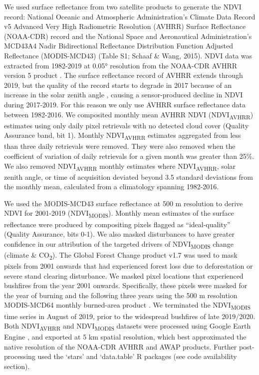 \documentclass[gc, manuscript]{copernicus}
\begin{document}
We used surface reflectance from two satellite products to generate the
NDVI record: National Oceanic and Atmospheric Administration's Climate
Data Record v5 Advanced Very High Radiometric Resolution (AVHRR) Surface
Reflectance (NOAA-CDR) record and the National Space and Aeronautical
Administration's MCD43A4 Nadir Bidirectional Reflectance Distribution
Function Adjusted Reflectance (MODIS-MCD43) (Table S1; Schaaf \& Wang,
2015). NDVI data was extracted from 1982-2019 at 0.05° resolution from
the NOAA-CDR AVHRR version 5 product \citep{vermoteNOAAClimateData2018}.
The surface reflectance record of AVHRR extends through 2019, but the
quality of the record starts to degrade in 2017 because of an increase
in the solar zenith angle \citep{jiEffectNOAASatellite2017a}, causing a
sensor-produced decline in NDVI during 2017-2019. For this reason we
only use AVHRR surface reflectance data between 1982-2016. We composited
monthly mean AVHRR NDVI (NDVI\textsubscript{AVHRR}) estimates using only
daily pixel retrievals with no detected cloud cover (Quality Assurance
band, bit 1). Monthly NDVI\textsubscript{AVHRR} estimates aggregated
from less than three daily retrievals were removed. They were also
removed when the coefficient of variation of daily retrievals for a
given month was greater than 25\%. We also removed
NDVI\textsubscript{AVHRR} monthly estimates where
NDVI\textsubscript{AVHRR}, solar zenith angle, or time of acquisition
deviated beyond 3.5 standard deviations from the monthly mean,
calculated from a climatology spanning 1982-2016.

We used the MODIS-MCD43 surface reflectance at 500 m resolution to
derive NDVI for 2001-2019 (NDVI\textsubscript{MODIS}). Monthly mean
estimates of the surface reflectance were produced by compositing pixels
flagged as ``ideal-quality'' (Quality Assurance, bits 0-1). We also
masked disturbances to have greater confidence in our attribution of the
targeted drivers of NDVI\textsubscript{MODIS} change (climate \&
CO\textsubscript{2}). The Global Forest Change product v1.7
\citep{hansenHighResolutionGlobalMaps2013e} was used to mask pixels from
2001 onwards that had experienced forest loss due to deforestation or
severe stand clearing disturbance. We masked pixel locations that
experienced bushfires from the year 2001 onwards. Specifically, these
pixels were masked for the year of burning and the following three years
using the 500 m resolution MODIS-MCD64 monthly burned-area product
\citep{giglioCollectionMODISBurned2018b}. We terminated the
NDVI\textsubscript{MODIS} time series in August of 2019, prior to the
widespread bushfires of late 2019/2020. Both NDVI\textsubscript{AVHRR}
and NDVI\textsubscript{MODIS} datasets were processed using Google Earth
Engine \citep{gorelickGoogleEarthEngine2017}, and exported at 5 km
spatial resolution, which best approximated the native resolution of the
NOAA-CDR AVHRR and AWAP products. Further post-processing used the
`stars' \citep{pebesmaStarsSpatiotemporalArrays2020} and `data.table'
\citep{dowleDataTableExtension2019} R packages (see code availability
section).
\end{document}
